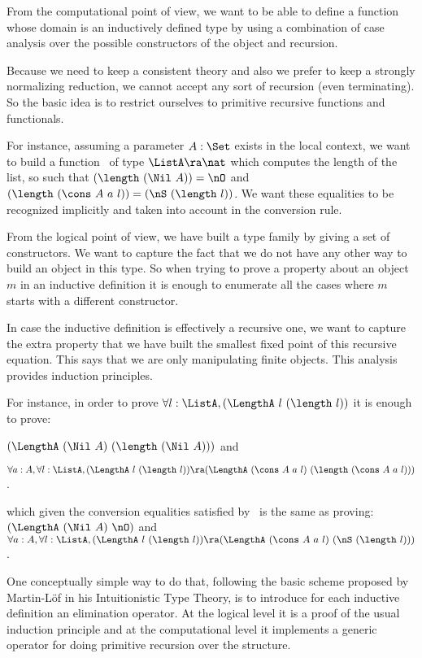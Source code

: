 From the computational point of view, we want to be able to define a
function whose domain is an inductively defined type by using a
combination of case analysis over the possible constructors of the
object and recursion.

Because we need to keep a consistent theory and also we prefer to keep
a strongly normalizing reduction, we cannot accept any sort of
recursion (even terminating). So the basic idea is to restrict
ourselves to primitive recursive functions and functionals.

For instance, assuming a parameter $A:\Set$ exists in the local context, we
want to build a function \length\ of type $\ListA\ra \nat$ which
computes the length of the list, so such that $(\length~(\Nil~A)) = \nO$
and $(\length~(\cons~A~a~l)) = (\nS~(\length~l))$.  We want these
equalities to be recognized implicitly and taken into account in the
conversion rule.

From the logical point of view, we have built a type family by giving
a set of constructors.  We want to capture the fact that we do not
have any other way to build an object in this type. So when trying to
prove a property about an object $m$ in an inductive definition it is
enough to enumerate all the cases where $m$ starts with a different
constructor.

In case the inductive definition is effectively a recursive one, we
want to capture the extra property that we have built the smallest
fixed point of this recursive equation.  This says that we are only
manipulating finite objects. This analysis provides induction
principles.

For instance, in order to prove $\forall l:\ListA,(\LengthA~l~(\length~l))$
it is enough to prove:

\noindent $(\LengthA~(\Nil~A)~(\length~(\Nil~A)))$ and

\smallskip
$\forall a:A, \forall l:\ListA, (\LengthA~l~(\length~l)) \ra
(\LengthA~(\cons~A~a~l)~(\length~(\cons~A~a~l)))$.
\smallskip

\noindent which given the conversion equalities satisfied by \length\ is the
same as proving:
$(\LengthA~(\Nil~A)~\nO)$ and $\forall a:A, \forall l:\ListA, 
(\LengthA~l~(\length~l)) \ra
(\LengthA~(\cons~A~a~l)~(\nS~(\length~l)))$.

One conceptually simple way to do that, following the basic scheme
proposed by Martin-L\"of in his Intuitionistic Type Theory, is to
introduce for each inductive definition an elimination operator. At
the logical level it is a proof of the usual induction principle and
at the computational level it implements a generic operator for doing
primitive recursion over the structure.

